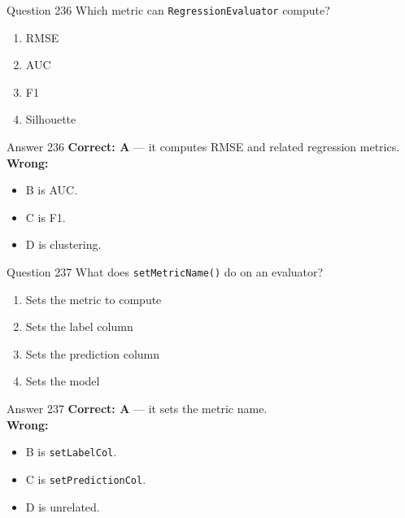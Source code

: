 \documentclass[aspectratio=169,11pt]{beamer}
\begin{document}
	\begin{frame}{Question 236}
		Which metric can \texttt{RegressionEvaluator} compute?
		\begin{enumerate}[label=\Alph*.]
			\item RMSE
			\item AUC
			\item F1
			\item Silhouette
		\end{enumerate}
	\end{frame}
	\begin{frame}{Answer 236}
		\textbf{Correct: A} --- it computes RMSE and related regression metrics.\\
		\vspace{0.5em}
		\textbf{Wrong:}
		\begin{itemize}
			\item B is AUC.
			\item C is F1.
			\item D is clustering.
		\end{itemize}
	\end{frame}
	
	\begin{frame}{Question 237}
		What does \texttt{setMetricName()} do on an evaluator?
		\begin{enumerate}[label=\Alph*.]
			\item Sets the metric to compute
			\item Sets the label column
			\item Sets the prediction column
			\item Sets the model
		\end{enumerate}
	\end{frame}
	\begin{frame}{Answer 237}
		\textbf{Correct: A} --- it sets the metric name.\\
		\vspace{0.5em}
		\textbf{Wrong:}
		\begin{itemize}
			\item B is \texttt{setLabelCol}.
			\item C is \texttt{setPredictionCol}.
			\item D is unrelated.
		\end{itemize}
	\end{frame}
	
\end{document}
